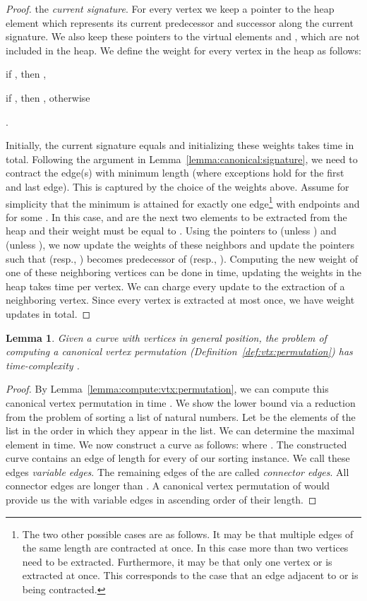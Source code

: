 \documentclass[11pt, letter]{article}
\newtheorem{lemma}[theorem]{Lemma}
\newcommand{\lemlab}[1]{\label{lemma:#1}}
\newcommand{\lemref}[1]{Lemma~\ref{lemma:#1}}
\newcommand{\defref}[1]{Definition~\ref{def:#1}}
\begin{document}
\begin{proof}
the \emph{current signature}. For every vertex we keep a pointer to the heap element which represents its current predecessor and successor along the current signature. We also keep these pointers to the virtual elements  and , which are not included in the heap.  We define the weight  for every vertex  in the heap as follows:
\begin{compactenum}[(i)]
\item if , then ,
\item if , then , otherwise
\item .
\end{compactenum}
Initially, the current signature equals  and initializing these weights takes  time in total. Following the argument in \lemref{canonical:signature}, we need to contract the edge(s) with minimum length (where exceptions hold for the first and last edge). This is captured by the choice of the weights above. Assume for simplicity that the minimum is attained for exactly one edge\footnote{The two other possible cases are as follows.  It may be that multiple edges of the same length are contracted at once. In this case more than two vertices need to be extracted. Furthermore, it may be that only one vertex  or  is extracted at once. This corresponds to the case that an edge adjacent to  or  is being contracted. } with endpoints  and  for some . In this case,  and  are the next two elements to be extracted from the heap and their weight must be equal to . Using the pointers to  (unless ) and  (unless ), we now update the weights of these neighbors and update the pointers such that  (resp., ) becomes predecessor of  (resp., ). Computing the new weight of one of these neighboring vertices can be done in  time, updating the weights in the heap takes  time per vertex. We can charge every update to the extraction of a neighboring vertex. Since every vertex is extracted at most once, we have  weight updates in total.
\end{proof}
\begin{lemma}\lemlab{lb:vtx:permutation}
Given a curve  with  vertices
in general position, the problem of computing a canonical vertex permutation (\defref{vtx:permutation}) has time-complexity .
\end{lemma}
\begin{proof}
By \lemref{compute:vtx:permutation}, we can compute this canonical vertex permutation in time .  We show the lower bound via a reduction from the problem of sorting a list of  natural numbers. Let  be the elements of the list in the order in which they appear in the list. We can determine the maximal element  in  time. We now construct a curve  as follows:  where . The constructed curve contains an edge of length  for every  of our sorting instance. We call these edges \emph{variable edges}. The remaining edges of the  are called \emph{connector edges}. All connector edges are longer than . A canonical vertex permutation of  would provide us the with variable edges in ascending order of their length. 
\end{proof}
\end{document}
